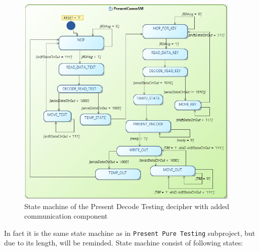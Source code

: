 \documentclass{gajewski}
\begin{document}
\begin{figure}[!ht]%
    \begin{center}
    \includegraphics[width=0.95\textwidth]{img/presentDecodeCommSM.png}
    \caption{%
        State machine of the Present Decode Testing decipher with added communication component
     }%
    \label{presentDecodeCommSM}
    \end{center}
 \end{figure}


In fact it is the same state machine as in \texttt{Present Pure Testing} subproject, but due to its length, will be reminded. State machine consist of following states:
\end{document}

